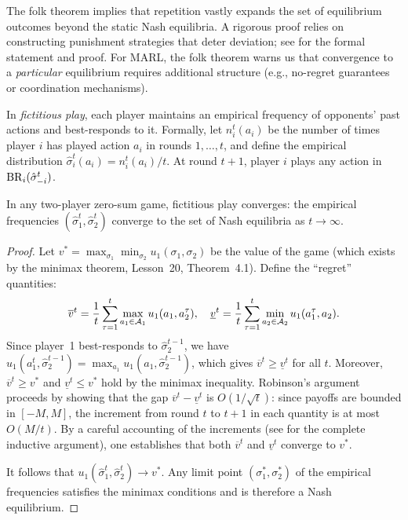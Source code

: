 \documentclass[11pt,a4paper]{article}
\begin{document}
\begin{remark}
The folk theorem implies that repetition vastly expands the set of
equilibrium outcomes beyond the static Nash equilibria.  A rigorous
proof relies on constructing punishment strategies that deter
deviation; see \citet[Chapter~5]{fudenberg1991} for the formal
statement and proof.  For MARL, the folk theorem warns us that
convergence to a \emph{particular} equilibrium requires additional
structure (e.g., no-regret guarantees or coordination mechanisms).
\end{remark}

\begin{definition}
\label{def:fictitious-play}
In \emph{fictitious play}, each player maintains an empirical
frequency of opponents' past actions and best-responds to it.
Formally, let $n_i^t(a_i)$ be the number of times player $i$ has
played action $a_i$ in rounds $1, \ldots, t$, and define the
empirical distribution
$\hat{\sigma}_i^t(a_i) = n_i^t(a_i) / t$.  At round $t+1$, player
$i$ plays any action in $\mathrm{BR}_i(\hat{\sigma}_{-i}^t)$.
\end{definition}

\begin{theorem}
\label{thm:robinson}
In any two-player zero-sum game, fictitious play converges: the
empirical frequencies $(\hat{\sigma}_1^t, \hat{\sigma}_2^t)$ converge
to the set of Nash equilibria as $t \to \infty$.
\end{theorem}

\begin{proof}
Let $v^* = \max_{\sigma_1} \min_{\sigma_2} u_1(\sigma_1, \sigma_2)$
be the value of the game (which exists by the minimax theorem,
Lesson~20, Theorem~4.1).  Define the ``regret'' quantities:
\begin{equation}
  \label{eq:fp-upper-lower}
  \overline{v}^t = \frac{1}{t}\sum_{\tau=1}^{t}
    \max_{a_1 \in \mathcal{A}_1} u_1(a_1, a_2^\tau), \quad
  \underline{v}^t = \frac{1}{t}\sum_{\tau=1}^{t}
    \min_{a_2 \in \mathcal{A}_2} u_1(a_1^\tau, a_2).
\end{equation}
Since player~1 best-responds to $\hat{\sigma}_2^{t-1}$, we have
$u_1(a_1^t, \hat{\sigma}_2^{t-1}) =
\max_{a_1} u_1(a_1, \hat{\sigma}_2^{t-1})$, which gives
$\overline{v}^t \geq \underline{v}^t$ for all $t$.  Moreover,
$\overline{v}^t \geq v^*$ and $\underline{v}^t \leq v^*$ hold by
the minimax inequality.  Robinson's argument proceeds by showing that
the gap $\overline{v}^t - \underline{v}^t$ is $O(1/\sqrt{t})$: since
payoffs are bounded in $[-M, M]$, the increment from round $t$ to
$t+1$ in each quantity is at most $O(M/t)$.  By a careful accounting
of the increments (see \citealt{robinson1951} for the complete
inductive argument), one establishes that both $\overline{v}^t$ and
$\underline{v}^t$ converge to $v^*$.

It follows that $u_1(\hat{\sigma}_1^t, \hat{\sigma}_2^t) \to v^*$.
Any limit point $(\sigma_1^*, \sigma_2^*)$ of the empirical
frequencies satisfies the minimax conditions and is therefore a Nash
equilibrium.
\end{proof}
\end{document}
